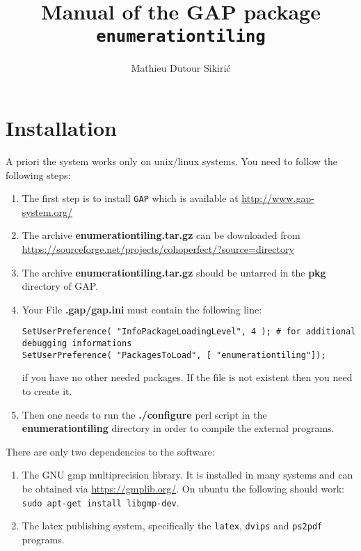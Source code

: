 \documentclass[12pt]{amsart}
\begin{document}
\author{Mathieu Dutour Sikiri\'c}
\address{Mathieu Dutour Sikiri\'c, Rudjer Boskovi\'c Institute, Bijenicka 54, 10000 Zagreb, Croatia}


\title{Manual of the GAP package {\tt enumerationtiling}}
\date{}

\maketitle
\tableofcontents

\section{Installation}

A priori the system works only on unix/linux systems.
You need to follow the following steps:
\begin{enumerate}
\item The first step is to install {\tt GAP} which is available at \url{http://www.gap-system.org/}

\item The archive {\bf enumerationtiling.tar.gz} can be downloaded from
  {\url{https://sourceforge.net/projects/cohoperfect/?source=directory}}

\item The archive {\bf enumerationtiling.tar.gz} should be untarred in the {\bf pkg} directory of GAP.

\item Your File {\bf .gap/gap.ini} must contain the following line:
\begin{verbatim}
SetUserPreference( "InfoPackageLoadingLevel", 4 ); # for additional debugging informations
SetUserPreference( "PackagesToLoad", [ "enumerationtiling"]);
\end{verbatim}
if you have no other needed packages. If the file is not existent then you need to create it.

\item Then one needs to run the {\bf ./configure} perl script in the {\bf enumerationtiling} directory in order to compile the external programs.
\end{enumerate}
There are only two dependencies to the software:
\begin{enumerate}
\item The GNU gmp multiprecision library. It is installed in many systems and can be obtained via \url{https://gmplib.org/}. On ubuntu the following should work: {\tt sudo apt-get install libgmp-dev}.
\item The latex publishing system, specifically the {\tt latex}, {\tt dvips} and {\tt ps2pdf} programs.  
\end{enumerate}
\end{document}
